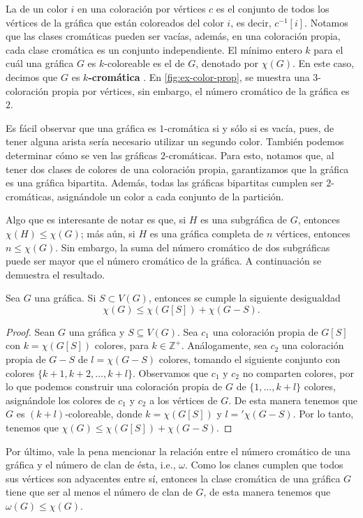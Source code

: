 \newpage

La  de un color $i$ en una coloraci\'on por v\'ertices
$c$ es el conjunto de todos los v\'ertices de la gr\'afica que est\'an
coloreados del color $i$, es decir, $c^{-1}[i]$. Notamos que las clases
crom\'aticas pueden ser vac\'ias, adem\'as, en una coloraci\'on propia, cada
clase crom\'atica es un conjunto independiente. El m\'inimo entero $k$ para el
cu\'al una gr\'afica $G$ es $k$-coloreable es el 
de $G$, denotado por $\chi(G)$. En este caso, decimos que $G$ es
$k$\textbf{-crom\'atica} . En
\cref{fig:ex-color-prop}, se muestra una $3$-coloraci\'on propia por v\'ertices,
sin embargo, el n\'umero crom\'atico de la gr\'afica es $2$. 

Es f\'acil observar que una gr\'afica es $1$-crom\'atica si y s\'olo si es
vac\'ia, pues, de tener alguna arista ser\'ia necesario utilizar un segundo
color. Tambi\'en podemos determinar c\'omo se ven las gr\'aficas
$2$-crom\'aticas. Para esto, notamos que, al tener dos clases de colores de una
coloraci\'on propia, garantizamos que la gr\'afica es una gr\'afica bipartita.
Adem\'as, todas las gr\'aficas bipartitas cumplen ser $2$-crom\'aticas,
asign\'andole un color a cada conjunto de la partici\'on.

Algo que es interesante de notar es que, si $H$ es una subgr\'afica de $G$,
entonces $\chi(H) \leq \chi(G)$; m\'as a\'un, si $H$ es una gr\'afica completa
de $n$ v\'ertices, entonces $n \leq \chi(G)$. Sin embargo, la suma del n\'umero
crom\'atico de dos subgr\'aficas puede ser mayor que el n\'umero crom\'atico de
la gr\'afica. A continuaci\'on se demuestra el resultado.

\begin{proposicion}
    Sea $G$ una gr\'afica.   Si $S \subset V(G)$, entonces se cumple la
    siguiente desigualdad
    \[
        \chi(G) \leq \chi(G[S])+\chi(G-S).
    \] 
\end{proposicion}

\begin{proof}
    Sean $G$ una gr\'afica y $S \subseteq V(G)$.  Sea $c_1$ una coloraci\'on
    propia de $G[S]$ con $ k= \chi(G[S])$ colores, para $k \in \mathbb{Z^+}$.
    An\'alogamente, sea $c_2$ una coloraci\'on propia de $G-S$ de $l= \chi(G-S)$
    colores, tomando el siguiente conjunto con colores $\{k+1, k+2, \dots,
    k+l\}$. Observamos que $c_1$ y $c_2$ no comparten colores, por lo que
    podemos construir una coloraci\'on propia de $G$ de $\{1, \dots, k+l\}$
    colores, asign\'andole los colores de $c_1$ y $c_2$ a los v\'ertices de $G$.
    De esta manera tenemos que $G$ es $(k+l)$-coloreable, donde $k = \chi(G[S])$
    y $l = '\chi(G-S)$. Por lo tanto, tenemos que $\chi(G) \leq
    \chi(G[S])+\chi(G-S)$.
\end{proof}

Por \'ultimo, vale la pena mencionar la relaci\'on entre el n\'umero crom\'atico
de una gr\'afica y el n\'umero de clan de \'esta, i.e., $\omega$. Como los
clanes cumplen que todos sus v\'ertices son adyacentes entre s\'i, entonces la
clase crom\'atica de una gr\'afica $G$ tiene que ser al menos el n\'umero de
clan de $G$, de esta manera tenemos que $\omega(G) \leq \chi(G)$.